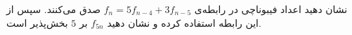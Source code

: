 \EXERCISE
نشان دهید اعداد فیبوناچی در رابطه‌ی
$f_n = 5f_{n-4} + 3f_{n-5}$
صدق می‌کنند. سپس از این رابطه استفاده کرده و نشان دهید
$f_{5n}$
بر
$5$
بخش‌پذیر است.
